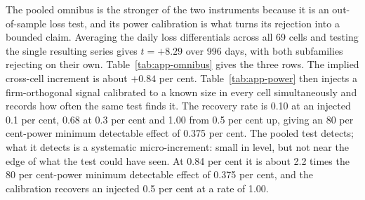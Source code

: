 The pooled omnibus is the stronger of the two instruments because it is an
out-of-sample loss test, and its power calibration is what turns its
rejection into a bounded claim. Averaging the daily loss differentials
across all 69 cells and testing the single resulting series gives $t =
+8.29$ over 996 days, with both subfamilies rejecting on their own.
Table~\ref{tab:app-omnibus} gives the three rows. The
implied cross-cell increment is about $+0.84$ per cent. Table~\ref{tab:app-power}
then injects a firm-orthogonal signal calibrated to a known size in every
cell simultaneously and records how often the same test finds it. The
recovery rate is 0.10 at an injected 0.1 per cent, 0.68 at 0.3 per cent and
1.00 from 0.5 per cent up, giving an 80 per cent-power minimum detectable
effect of 0.375 per cent. The pooled test detects; what it detects is a
systematic micro-increment: small in level, but not near the edge of what
the test could have seen. At 0.84 per cent it is about 2.2 times the
80 per cent-power minimum detectable effect of 0.375 per cent, and the
calibration recovers an injected 0.5 per cent at a rate of 1.00. %

